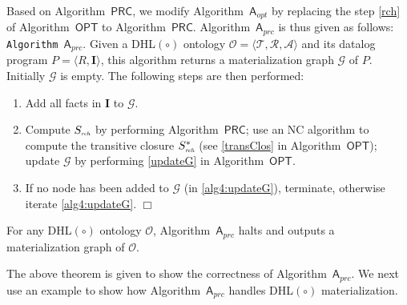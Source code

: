 Based on Algorithm~$\mathsf{PRC}$, we modify Algorithm~$\mathsf{A}_{opt}$
by replacing the step \ref{rch} of Algorithm~$\mathsf{OPT}$
to Algorithm~$\mathsf{PRC}$. Algorithm~$\mathsf{A}_{prc}$
is thus given as follows:\\

\noindent\texttt{Algorithm~$\mathsf{A}_{prc}$}. Given
a DHL$(\circ)$ ontology $\mathcal{O}=\langle\mathcal{T},\mathcal{R},\mathcal{A}\rangle$ and its
datalog program $P=\langle R, \textbf{I}\rangle$, this algorithm
returns a materialization graph $\mathcal{G}$ of $P$.
Initially $\mathcal{G}$ is empty. The following steps are then performed:
\begin{enumerate}[leftmargin=8ex,label=(\textit{Step \arabic*}),ref=Step~\arabic*]
\item Add all facts in $\textbf{I}$ to $\mathcal{G}$.\label{alg4:addFacts}
\item Compute $S_{\textit{\tiny rch}}$ by performing Algorithm~$\mathsf{PRC}$; use an NC
    algorithm to compute the transitive closure $S^*_{\textit{\tiny rch}}$ (see \ref{transClos} in Algorithm~$\mathsf{OPT}$);
    update $\mathcal{G}$ by performing \ref{updateG} in Algorithm~$\mathsf{OPT}$.\label{alg4:updateG}
\item If no node has been added to $\mathcal{G}$ (in \ref{alg4:updateG}), terminate,
    otherwise iterate \ref{alg4:updateG}. \label{alg4:halt}\hfill$\Box$
\end{enumerate}

\begin{theorem}\label{theorem:aprc}
For any DHL$(\circ)$ ontology $\mathcal{O}$, Algorithm~$\mathsf{A}_{prc}$ halts and outputs
a materialization graph of $\mathcal{O}$.
\end{theorem}

The above theorem is given to show the correctness of Algorithm~$\mathsf{A}_{prc}$.
We next use an example to show how Algorithm~$\mathsf{A}_{prc}$ handles
DHL$(\circ)$ materialization.

